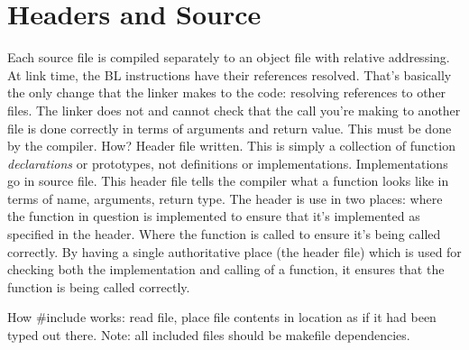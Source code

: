 \section{Headers and Source}
Each source file is compiled separately to an object file with relative addressing.
At link time, the BL instructions have their references resolved. That's basically the only change that the linker makes to the code: resolving references to other files.
The linker does not and cannot check that the call you're making to another file is done correctly in terms of arguments and return value.
This must be done by the compiler. How?
Header file written. This is simply a collection of function \emph{declarations} or prototypes, not definitions or implementations. Implementations go in source file.
This header file tells the compiler what a function looks like in terms of name, arguments, return type. 
The header is use in two places: where the function in question is implemented to ensure that it's implemented as specified in the header. Where the function is called to ensure it's being called correctly.
By having a single authoritative place (the header file) which is used for checking both the implementation and calling of a function, it ensures that the function is being called correctly.

How \#include works: read file, place file contents in location as if it had been typed out there.
Note: all included files should be makefile dependencies. 
